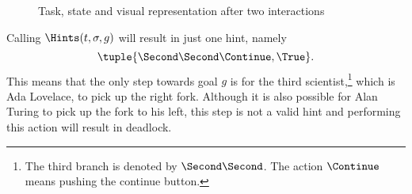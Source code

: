 \begin{figure}[t]
\begin{minipage}[r]{0.3\textwidth}
  \end{minipage}
  \caption{Task, state and visual representation after two interactions}
  \label{fig:dining-middle}
\end{figure}

Calling $\Hints(t,\sigma,g)$ will result in just one hint, namely
\begin{equation*}
  \tuple{\Second\Second\Continue,\True}.
\end{equation*}
This means that the only step towards goal $g$ is for the third scientist,\footnote{
  The third branch is denoted by $\Second\Second$.
  The action $\Continue$ means pushing the continue button.
}
which is Ada Lovelace, to pick up the right fork.
Although it is also possible for Alan Turing to pick up the fork to his left,
this step is not a valid hint and performing this action will result in deadlock.
